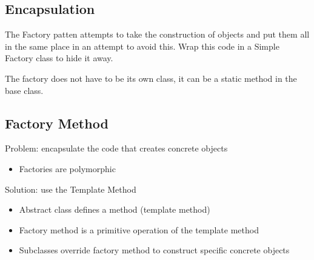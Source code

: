 \documentclass[12pt]{article}
\begin{document}
\subsection{Encapsulation}
The Factory patten attempts to take the construction of objects and put them all in the same place in an attempt to avoid this. Wrap this code in a Simple Factory class to hide it away.

The factory does not have to be its own class, it can be a static method in the base class.

\subsection*{Factory Method}
Problem: encapsulate the code that creates concrete objects
\begin{itemize}
   \item  Factories are polymorphic
 \end{itemize}
Solution: use the Template Method
\begin{itemize}
  \item Abstract class defines a method (template method)
  \item Factory method is a primitive operation of the template method
  \item Subclasses override factory method to construct specific concrete objects
\end{itemize}
\end{document}
